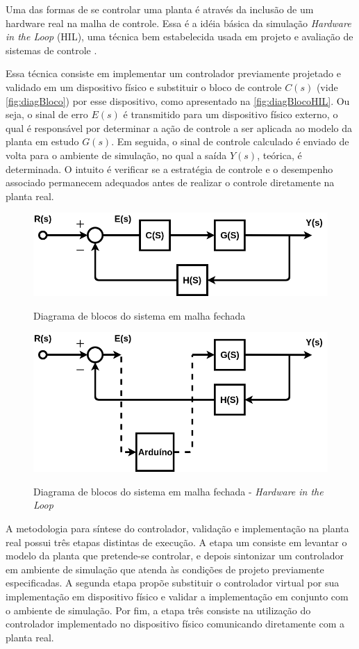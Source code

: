 Uma das formas de se controlar uma planta é através da inclusão de um hardware real na malha
de controle. Essa é a idéia básica da simulação \emph{Hardware in the Loop} (HIL), uma técnica
bem estabelecida usada em projeto e avaliação de sistemas de controle \cite{Bacic}.

Essa técnica consiste em implementar um controlador previamente projetado e validado em um dispositivo físico e 
substituir o bloco de controle $C(s)$ (vide \autoref{fig:diagBloco}) por esse dispositivo, como apresentado na 
\autoref{fig:diagBlocoHIL}. Ou seja, o sinal de erro $E(s)$ é transmitido para um dispositivo físico externo, 
o qual é responsável por determinar a ação de controle a ser aplicada ao modelo da planta em estudo $G(s)$. Em seguida, o 
sinal de controle calculado é enviado de volta para o ambiente de simulação, no qual a saída $Y(s)$, teórica, 
é determinada. O intuito é verificar se a estratégia de controle e o desempenho associado permanecem 
adequados antes de realizar o controle diretamente na planta real.

\begin{figure}[ht]
  \centering
  \caption{Diagrama de blocos do sistema em malha fechada}
  \includegraphics[width = 0.6\columnwidth]{Imagens/blocosMF.png}
  \label{fig:diagBloco} 
\end{figure}

\begin{figure}[ht]
  \centering
  \caption{Diagrama de blocos do sistema em malha fechada - \emph{Hardware in the Loop}}
  \includegraphics[width = 0.7\columnwidth]{Imagens/blocoHard.png}
  \label{fig:diagBlocoHIL} 
\end{figure}

A metodologia para síntese do controlador, validação e implementação na planta real possui
três etapas distintas de execução. A etapa um consiste em levantar o modelo da planta que 
pretende-se controlar, e depois sintonizar um controlador em ambiente de simulação que atenda
às condições de projeto previamente especificadas. A segunda etapa propõe substituir 
o controlador virtual por sua implementação em dispositivo físico e validar a implementação 
em conjunto com o ambiente de simulação. Por fim, a etapa três consiste na utilização do controlador
implementado no dispositivo físico comunicando diretamente com a planta real.

